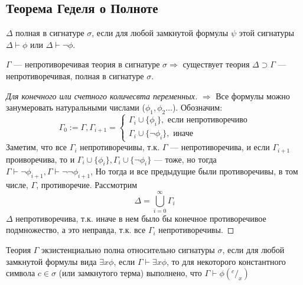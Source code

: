 
\subsection{Теорема Геделя о Полноте}

\begin{definition}
    $\Delta$ полная в сигнатуре $\sigma$, если для любой замкнутой формулы $\psi$ этой сигнатуры $\Delta \vdash \phi$ или $\Delta \vdash \neg\phi$.
\end{definition}

\begin{lemma}
    $\Gamma$ --- непротиворечивая теория в сигнатуре $\sigma \Rightarrow$ существует теория $\Delta \supset \Gamma$ --- непротиворечивая, полная в сигнатуре $\sigma$.
\end{lemma}
\begin{proof}[Для конечного или счетного количесвта переменных]
    $\Rightarrow$ Все формулы можно занумеровать натуральными числами ($\phi_1, \phi_2 \dots$). Обозначим:
    $$\Gamma_0 := \Gamma, \Gamma_{i+1} = \left\{\begin{array}{l}
        \Gamma_i \cup \{\phi_i\}, \text{ если непротиворечиво}  \\
        \Gamma_i \cup \{\neg\phi_i\}, \text{ иначе}
    \end{array}\right.$$
    Заметим, что все $\Gamma_i$ непротиворечивы, т.к. $\Gamma$ --- непротиворечива, и если $\Gamma_{i+1}$ проиворечива, то и $\Gamma_i \cup \{\phi_i\}, \Gamma_i \cup \{\neg\phi_i\}$ --- тоже, но тогда $\Gamma \vdash \neg\phi_{i+1}, \Gamma \vdash \neg\neg\phi_{i+1}$, Но тогда и все предыдущие были противоречивы, в том числе, $\Gamma$, противоречие.
    Рассмотрим
    $$\Delta = \bigcup_{i = 0}^\infty\Gamma_i$$
    $\Delta$ непротиворечива, т.к. иначе в нем было бы конечное противоречивое подмножество, а это неправда, т.к. все $\Gamma_i$ непротиворечивы.
\end{proof}

\begin{definition}
    Теория $\Gamma$ экзистенциально полна относительно сигнатуры $\sigma$, если для любой замкнутой формулы вида $\exists x \phi$, если $\Gamma \vdash \exists x \phi$, то для некоторого константного символа $c \in \sigma$ (или замкнутого терма) выполнено, что $\Gamma \vdash \phi(^c/_x)$
\end{definition}

